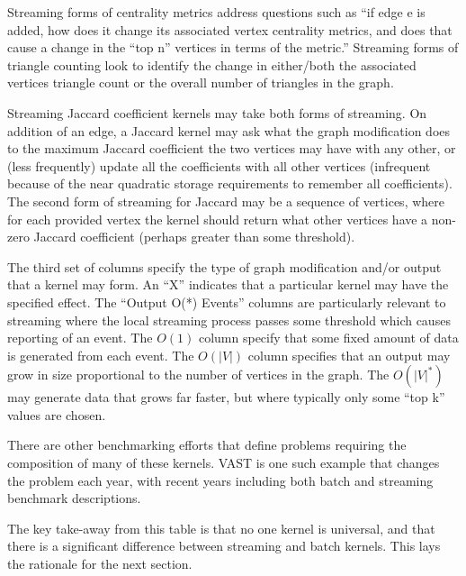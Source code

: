 Streaming forms of centrality metrics address questions such as ``if edge e is added, how does it change its associated vertex centrality metrics, and does that cause a change in the ``top n'' vertices in terms of the metric.'' Streaming forms of triangle counting look to identify the change in either/both the associated vertices triangle count or the overall number of triangles in the graph.

Streaming Jaccard coefficient kernels may take both forms of streaming. On addition of an edge, a Jaccard kernel may ask what the graph modification does to the maximum Jaccard coefficient the two vertices may have with any other, or (less frequently) update all the coefficients with all other vertices (infrequent because of the near quadratic storage requirements to remember all coefficients). The second form of streaming for Jaccard may be a sequence of vertices, where for each provided vertex the kernel should return what other vertices have a non-zero Jaccard coefficient (perhaps greater than some threshold).

The third set of columns specify the type of graph modification and/or output that a kernel may form. An ``X'' indicates that a particular kernel may have the specified effect. The ``Output O(*) Events'' columns are particularly relevant to streaming where the local streaming process passes some threshold which causes reporting of an event. The $O(1)$ column specify that some fixed amount of data is generated from each event. The $O(|V|)$ column specifies that an output may grow in size proportional to the number of vertices in the graph. The $O(|V|^*)$ may generate data that grows far faster, but where typically only some ``top k'' values are chosen.

There are other benchmarking efforts that define problems requiring the composition of many of these kernels. VAST\cite{sga-vast} is one such example that changes the problem each year, with recent years including both batch and streaming benchmark descriptions.

The key take-away from this table is that no one kernel is universal, and that there is a significant difference between streaming and batch kernels. This lays the rationale for the next section.
